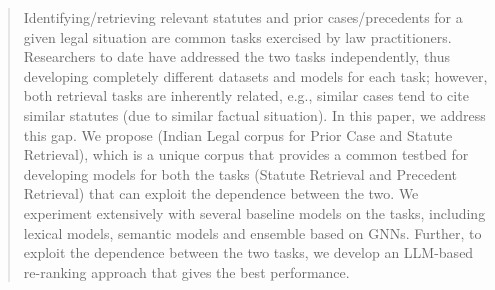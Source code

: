 
\begin{abstract}
Identifying/retrieving relevant statutes and prior cases/precedents for a given legal situation are common tasks exercised by law practitioners. Researchers to date have addressed the two tasks independently, thus developing completely different datasets and models for each task; however, both retrieval tasks are inherently related, e.g., similar cases tend to cite similar statutes (due to similar factual situation). 
In this paper, we address this gap. We propose \ilpcsr{} (Indian Legal corpus for Prior Case and Statute Retrieval), which is a unique corpus that provides a common testbed for developing models for both the tasks (Statute Retrieval and Precedent Retrieval) that can exploit the dependence between the two. We experiment extensively with several baseline models on the tasks, including lexical models, semantic models and ensemble based on GNNs. Further, to exploit the dependence between the two tasks, we develop an LLM-based re-ranking approach that gives the best performance. 
\end{abstract}


